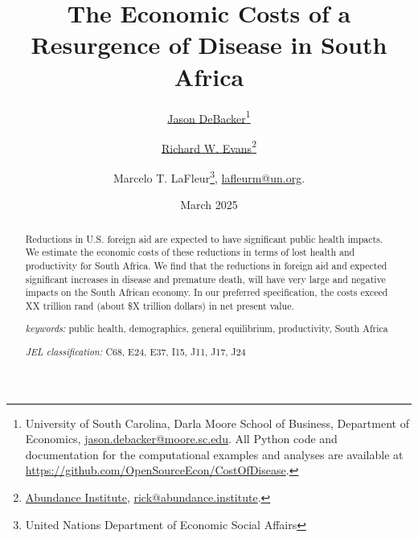 \documentclass[letterpaper,12pt]{article}
\theoremstyle{definition}
\begin{document}
\begin{titlepage}
\title{The Economic Costs of a Resurgence of Disease in South Africa}
\date{March 2025}
\author{\href{http://jasondebacker.com/}{Jason DeBacker}\thanks{University of South Carolina, Darla Moore School of Business, Department of Economics, \href{mailto:jason.debacker@moore.sc.edu}{jason.debacker@moore.sc.edu}. All Python code and documentation for the computational examples and analyses are available at \href{https://github.com/OpenSourceEcon/CostOfDisease}{https://github.com/OpenSourceEcon/CostOfDisease}.}\and \href{https://sites.google.com/site/rickecon}{Richard W. Evans}\thanks{\href{https://abundance.institute/}{Abundance Institute}, \href{mailto:rick@abundance.institute}{rick@abundance.institute}.}\and Marcelo T. LaFleur\thanks{United Nations Department of Economic Social Affairs}, \href{mailto:lafleurm@un.org}{lafleurm@un.org}.}
\maketitle
\vspace{-2mm}
\begin{abstract}
\small{Reductions in U.S. foreign aid are expected to have significant public health impacts.  We estimate the economic costs of these reductions in terms of lost health and productivity for South Africa.  We find that the reductions in foreign aid and expected significant increases in disease and premature death, will have very large and negative impacts on the South African economy.  In our preferred specification, the costs exceed XX trillion rand (about \$X trillion dollars) in net present value.}

\vspace{10mm}

\noindent\textit{keywords:}\: public health, demographics, general equilibrium, productivity, South Africa

\vspace{10mm}

\noindent\textit{JEL classification:} C68, E24, E37, I15, J11, J17, J24


\end{abstract}
\thispagestyle{empty}
\end{titlepage}
\end{document}
